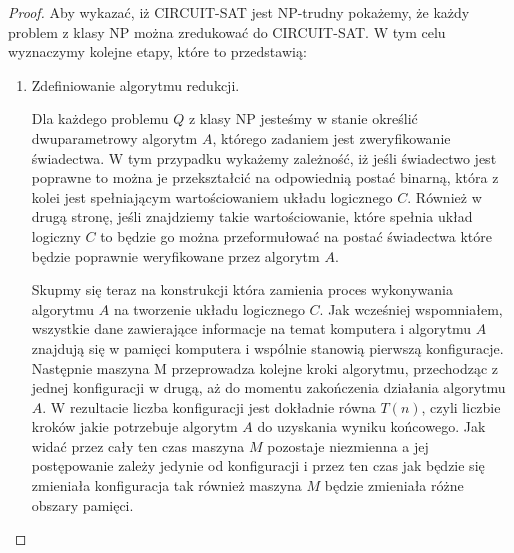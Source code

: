 \begin{proof}
Aby wykazać, iż CIRCUIT-SAT jest NP-trudny pokażemy, że każdy problem z klasy NP można zredukować do CIRCUIT-SAT. W tym celu wyznaczymy kolejne etapy, które to przedstawią:


\begin{enumerate}
\item Zdefiniowanie algorytmu redukcji.

Dla każdego problemu $Q$ z klasy NP jesteśmy w stanie określić dwuparametrowy algorytm $A$, którego zadaniem jest zweryfikowanie świadectwa. W tym przypadku wykażemy zależność, iż jeśli świadectwo jest poprawne to można je przekształcić na odpowiednią postać binarną, która z kolei jest spełniającym wartościowaniem układu logicznego $C$. Również w drugą stronę, jeśli znajdziemy takie wartościowanie, które spełnia układ logiczny $C$ to będzie go można przeformułować na postać świadectwa które będzie poprawnie weryfikowane przez algorytm $A$.

Skupmy się teraz na konstrukcji która zamienia proces wykonywania algorytmu $A$ na tworzenie układu logicznego $C$. Jak wcześniej wspomniałem, wszystkie dane zawierające informacje na temat komputera i algorytmu $A$ znajdują się w pamięci komputera i wspólnie stanowią pierwszą konfiguracje. Następnie maszyna M przeprowadza kolejne kroki algorytmu, przechodząc z jednej konfiguracji w drugą, aż do momentu zakończenia działania algorytmu $A$. W rezultacie liczba konfiguracji jest dokładnie równa $T(n)$, czyli liczbie kroków jakie potrzebuje algorytm $A$ do uzyskania wyniku końcowego. Jak widać przez cały ten czas maszyna $M$ pozostaje niezmienna a jej postępowanie zależy jedynie od konfiguracji i przez ten czas jak będzie się zmieniała konfiguracja tak również maszyna $M$ będzie zmieniała różne obszary pamięci.
	

\end{enumerate}
\end{proof}
